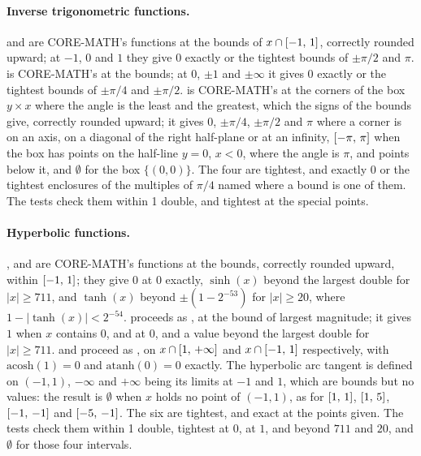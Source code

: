 \documentclass[12pt,a4paper,twoside,openright]{book}
\begin{document}
\paragraph{Inverse trigonometric functions.}
 and  are CORE-MATH's functions at the bounds
of $x\cap[-1,\,1]$, correctly rounded upward; at $-1$, $0$ and $1$ they
give $0$ exactly or the tightest bounds of $\pm\pi/2$ and $\pi$.
 is CORE-MATH's  at the bounds; at $0$, $\pm1$
and $\pm\infty$ it gives $0$ exactly or the tightest bounds of $\pm\pi/4$
and $\pm\pi/2$.  is CORE-MATH's  at the
corners of the box $y\times x$ where the angle is the least and the
greatest, which the signs of the bounds give, correctly rounded upward; it
gives $0$, $\pm\pi/4$, $\pm\pi/2$ and $\pi$ where a corner is on an axis,
on a diagonal of the right half-plane or at an infinity, $[-\pi,\,\pi]$
when the box has points on the half-line $y=0$, $x<0$, where the angle is
$\pi$, and points below it, and $\emptyset$ for the box $\{(0, 0)\}$. The
four are tightest, and exactly $0$ or the tightest enclosures of the
multiples of $\pi/4$ named where a bound is one of them. The tests check
them within 1 double, and tightest at the special points.

\paragraph{Hyperbolic functions.}
,  and  are CORE-MATH's
functions at the bounds, correctly rounded upward,  within
$[-1,\,1]$; they give $0$ at $0$ exactly, $\sinh(x)$ beyond the largest
double for $|x|\geq711$, and $\tanh(x)$ beyond $\pm(1-2^{-53})$ for
$|x|\geq20$, where $1-|\tanh(x)|<2^{-54}$.  proceeds as
, at the bound of largest magnitude; it gives $1$ when $x$
contains $0$, and at $0$, and a value beyond the largest double for
$|x|\geq711$.  and  proceed as ,
on $x\cap[1,\,+\infty]$ and $x\cap[-1,\,1]$ respectively, with
$\mathrm{acosh}(1)=0$ and $\mathrm{atanh}(0)=0$ exactly. The hyperbolic arc
tangent is defined on $(-1, 1)$, $-\infty$ and $+\infty$ being its limits
at $-1$ and $1$, which are bounds but no values: the result is $\emptyset$
when $x$ holds no point of $(-1, 1)$, as for $[1,\,1]$, $[1,\,5]$,
$[-1,\,-1]$ and $[-5,\,-1]$.\newinvfive{} The six are tightest, and
exact at the points given. The tests check them within 1 double, tightest
at $0$, at $1$, and beyond $711$ and $20$, and $\emptyset$ for those four
intervals.
\end{document}
